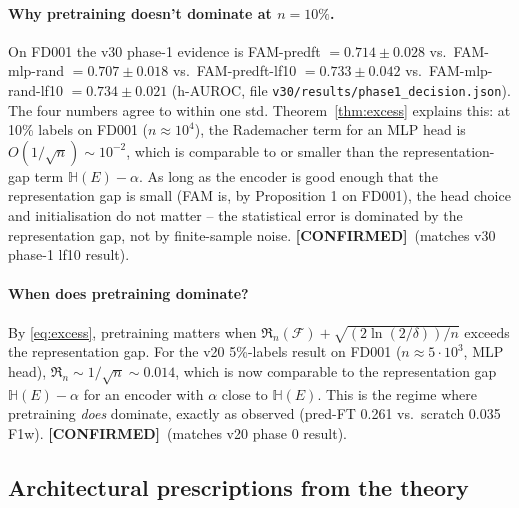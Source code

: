 \documentclass[11pt]{article}
\newcommand{\CONF}{{\color{black!60!green}\textbf{[CONFIRMED]}}}
\begin{document}
\paragraph{Why pretraining doesn't dominate at $n=10\%$.}
On FD001 the v30 phase-1 evidence is FAM-predft $=0.714\pm 0.028$ vs.\
FAM-mlp-rand $=0.707\pm 0.018$ vs.\ FAM-predft-lf10 $=0.733\pm 0.042$
vs.\ FAM-mlp-rand-lf10 $=0.734\pm 0.021$ (h-AUROC, file
\texttt{v30/results/phase1\_decision.json}). The four numbers agree to
within one std. Theorem~\ref{thm:excess} explains this: at 10\% labels
on FD001 ($n\approx 10^4$), the Rademacher term for an MLP head is
$O(1/\sqrt n)\sim 10^{-2}$, which is comparable to or smaller than the
representation-gap term $\mathbb{H}(E)-\alpha$. As long as the encoder is good
enough that the representation gap is small (FAM is, by Proposition 1
on FD001), the head choice and initialisation do not matter -- the
statistical error is dominated by the representation gap, not by
finite-sample noise. \CONF\ (matches v30 phase-1 lf10 result).

\paragraph{When does pretraining dominate?}
By \eqref{eq:excess}, pretraining matters when
$\mathfrak R_n(\mathcal F)+\sqrt{(2\ln(2/\delta))/n}$ exceeds the
representation gap. For the v20 5\%-labels result on FD001
($n\approx 5\cdot 10^3$, MLP head), $\mathfrak R_n\sim 1/\sqrt n\sim 0.014$,
which is now comparable to the representation gap $\mathbb{H}(E)-\alpha$ for an
encoder with $\alpha$ close to $\mathbb{H}(E)$. This is the regime where pretraining
\emph{does} dominate, exactly as observed (pred-FT 0.261 vs.\ scratch
0.035 F1w). \CONF\ (matches v20 phase 0 result).

\subsection{Architectural prescriptions from the theory}
\end{document}
